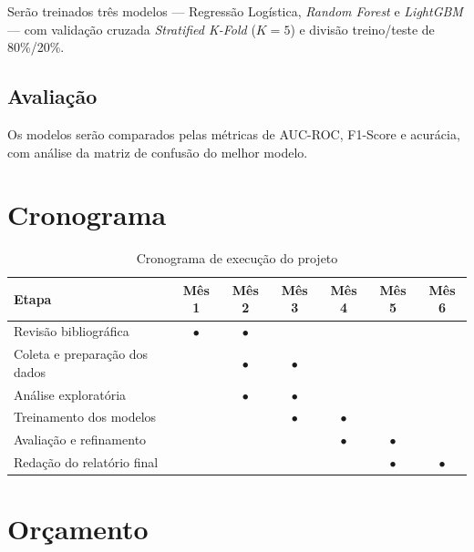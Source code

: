 \documentclass[
    article,
    12pt,
    oneside,
    a4paper,
    english,
    brazilian
    ]{abntex2}
\numberwithin{equation}{section}
\begin{document}
Serão treinados três modelos --- Regressão Logística, \textit{Random Forest} e \textit{LightGBM} --- com validação cruzada \textit{Stratified K-Fold} ($K = 5$) e divisão treino/teste de 80\%/20\%.

\subsection{Avaliação}

Os modelos serão comparados pelas métricas de AUC-ROC, F1-Score e acurácia, com análise da matriz de confusão do melhor modelo.

\section{Cronograma}

\begin{table}[htbp]
\centering
\caption{Cronograma de execução do projeto}
\label{tab:cronograma}
\small
\begin{tabular}{p{5.2cm}cccccc}
\toprule
\textbf{Etapa} & \textbf{Mês 1} & \textbf{Mês 2} & \textbf{Mês 3} & \textbf{Mês 4} & \textbf{Mês 5} & \textbf{Mês 6} \\
\midrule
Revisão bibliográfica         & $\bullet$ & $\bullet$ & & & & \\
Coleta e preparação dos dados & & $\bullet$ & $\bullet$ & & & \\
Análise exploratória          & & $\bullet$ & $\bullet$ & & & \\
Treinamento dos modelos       & & & $\bullet$ & $\bullet$ & & \\
Avaliação e refinamento       & & & & $\bullet$ & $\bullet$ & \\
Redação do relatório final    & & & & & $\bullet$ & $\bullet$ \\
\bottomrule
\end{tabular}
\vspace{2mm}
\end{table}

\section{Orçamento}
\end{document}
